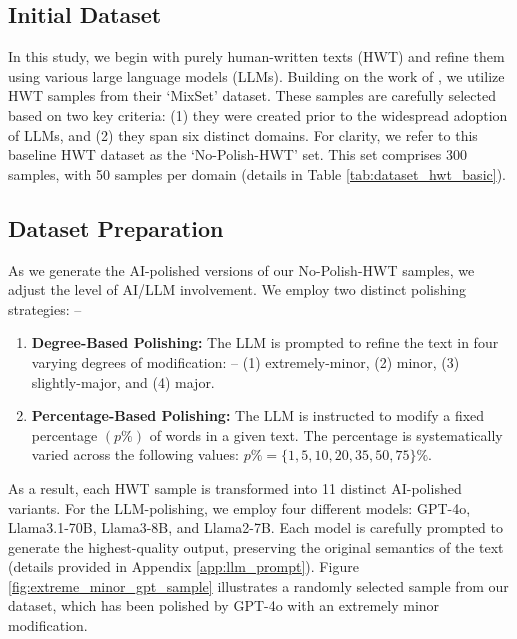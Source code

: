 \subsection{Initial Dataset}
In this study, we begin with purely human-written texts (HWT) and refine them using various large language models (LLMs). Building on the work of \citet{zhang2024llm}, we utilize HWT samples from their `MixSet' dataset. These samples are carefully selected based on two key criteria: (1) they were created prior to the widespread adoption of LLMs, and (2) they span six distinct domains. For clarity, we refer to this baseline HWT dataset as the `No-Polish-HWT' set. This set comprises 300 samples, with 50 samples per domain (details in Table \ref{tab:dataset_hwt_basic}).


\subsection{Dataset Preparation}
As we generate the AI-polished versions of our No-Polish-HWT samples, we adjust the level of AI/LLM involvement. We employ two distinct polishing strategies: --
\begin{enumerate}
    \item \textbf{Degree-Based Polishing:} The LLM is prompted to refine the text in four varying degrees of modification: -- (1) extremely-minor, (2) minor, (3) slightly-major, and (4) major.

    \item \textbf{Percentage-Based Polishing:} The LLM is instructed to modify a fixed percentage $(p\%)$ of words in a given text. The percentage is systematically varied across the following values: $p\% = \{1, 5, 10, 20, 35, 50, 75 \}\%$.
\end{enumerate}

As a result, each HWT sample is transformed into 11 distinct AI-polished variants. For the LLM-polishing, we employ four different models: GPT-4o, Llama3.1-70B, Llama3-8B, and Llama2-7B. Each model is carefully prompted to generate the highest-quality output, preserving the original semantics of the text (details provided in Appendix \ref{app:llm_prompt}). Figure \ref{fig:extreme_minor_gpt_sample} illustrates a randomly selected sample from our dataset, which has been polished by GPT-4o with an extremely minor modification.



